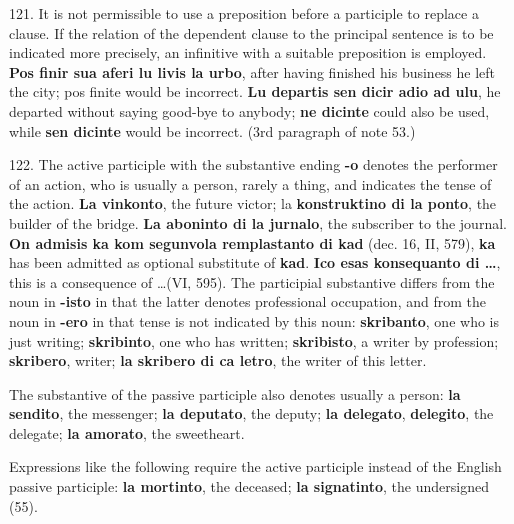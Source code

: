 121. It is not permissible to use a preposition before a participle to replace a clause. If the relation of the dependent clause to the principal sentence is to be indicated more precisely, an infinitive with a suitable preposition is employed. \textbf{Pos finir sua aferi lu livis la urbo}, after having finished his business he left the city; pos finite would be incorrect. \textbf{Lu departis sen dicir adio ad ulu}, he departed without saying good-bye to anybody; \textbf{ne dicinte} could also be used, while \textbf{sen dicinte} would be incorrect. (3rd paragraph of note 53.)

122. The active participle with the substantive ending \textbf{-o} denotes the performer of an action, who is usually a person, rarely a thing, and indicates the tense of the action. \textbf{La vinkonto}, the future victor; la \textbf{konstruktino di la ponto}, the builder of the bridge. \textbf{La aboninto di la jurnalo}, the subscriber to the journal. \textbf{On admisis ka kom segunvola remplastanto di kad} (dec. 16, II, 579), \textbf{ka} has been admitted as optional substitute of \textbf{kad}. \textbf{Ico esas konsequanto di \ldots}, this is a consequence of \ldots (VI, 595). The participial substantive differs from the noun in \textbf{-isto} in that the latter denotes professional occupation, and from the noun in \textbf{-ero} in that tense is not indicated by this noun: \textbf{skribanto}, one who is just writing; \textbf{skribinto}, one who has written; \textbf{skribisto}, a writer by profession; \textbf{skribero}, writer; \textbf{la skribero di ca letro}, the writer of this letter.

The substantive of the passive participle also denotes usually a person: \textbf{la sendito}, the messenger; \textbf{la deputato}, the deputy; \textbf{la delegato}, \textbf{delegito}, the delegate; \textbf{la amorato}, the sweetheart.

Expressions like the following require the active participle instead of the English passive participle: \textbf{la mortinto}, the deceased; \textbf{la signatinto}, the undersigned (55).

